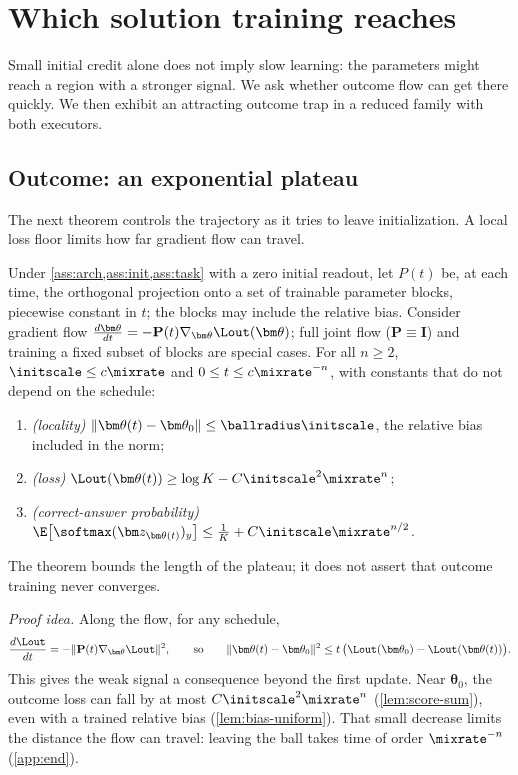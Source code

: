 \section{Which solution training reaches}
\label{sec:reach}

Small initial credit alone does not imply slow learning: the parameters might reach a region with a stronger signal. We ask
whether outcome flow can get there quickly. We then exhibit an attracting outcome trap in a reduced family with both executors.

\subsection{Outcome: an exponential plateau}

The next theorem controls the trajectory as it tries to leave initialization. A local loss floor limits how far gradient flow can travel.

\begin{theorem}
\label{thm:outcome-end}
Under \cref{ass:arch,ass:init,ass:task} with a zero initial readout, let $P(t)$ be, at each time, the orthogonal projection onto a set
of trainable parameter blocks, piecewise constant in $t$; the blocks may include the relative bias. Consider gradient flow
$\tfrac{d\bm\theta}{dt}=-\mathbf P(t)\nabla_{\bm\theta}\Lout(\bm\theta)$; full joint flow ($\mathbf P\equiv\mathbf I$) and training a fixed subset of blocks are special cases.
For all $n\ge2$, $\initscale\le c\mixrate$ and $0\le t\le c\mixrate^{-n}$, with constants that do not depend on the schedule:
\begin{enumerate}[label=(\roman*),leftmargin=*,itemsep=0pt,topsep=2pt]
\item \emph{(locality)} $\|\bm\theta(t)-\bm\theta_0\|\le\ballradius\initscale$, the relative bias included in the norm;
\item \emph{(loss)} $\Lout(\bm\theta(t))\ge\log K-C\initscale^2\mixrate^n$;
\item \emph{(correct-answer probability)} $\E\bigl[\softmax(\bm z_{\bm\theta(t)})_y\bigr]\le\frac{1}{K}+C\initscale\mixrate^{n/2}$.
\end{enumerate}
\end{theorem}
The theorem bounds the length of the plateau; it does not assert that outcome training never converges.

\emph{Proof idea.} Along the flow, for any schedule,
\[
 \frac{d\Lout}{dt}=-\|\mathbf P(t)\nabla_{\bm\theta}\Lout\|^2,
 \qquad\text{so}\qquad
 \|\bm\theta(t)-\bm\theta_0\|^2\le t\,\bigl(\Lout(\bm\theta_0)-\Lout(\bm\theta(t))\bigr).
\]
This gives the weak signal a consequence beyond the first update. Near $\bm\theta_0$, the outcome loss can fall by at most
$C\initscale^2\mixrate^n$ (\cref{lem:score-sum}), even with a trained relative bias (\cref{lem:bias-uniform}). That small decrease limits
the distance the flow can travel: leaving the ball takes time of order $\mixrate^{-n}$ (\cref{app:end}).

